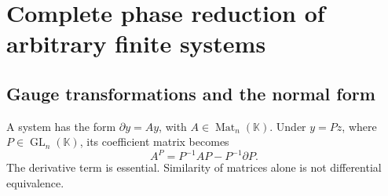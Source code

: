 \documentclass[11pt,a4paper]{article}
\numberwithin{equation}{section}
\theoremstyle{definition}
\theoremstyle{remark}
\newcommand{\K}{\mathbb K}
\newcommand{\GL}{\operatorname{GL}}
\newcommand{\Mat}{\operatorname{Mat}}
\begin{document}
\section{Complete phase reduction of arbitrary finite systems}\label{sec:normal}

\subsection{Gauge transformations and the normal form}
A system has the form $\partial y=Ay$, with $A\in\Mat_n(\K)$. Under
$y=Pz$, where $P\in\GL_n(\K)$, its coefficient matrix becomes
\begin{equation}\label{eq:gauge}
 A^P=P^{-1}AP-P^{-1}\partial P.
\end{equation}
The derivative term is essential. Similarity of matrices alone is not
differential equivalence.
\end{document}
